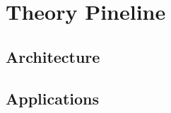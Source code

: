 
\chapter{Theory Pineline}
\label{ch:pine}
\minitoc
\adjustmtc



\section{Architecture}
\label{sec:pine/arch}


\section{Applications}
\label{sec:pine/app}

